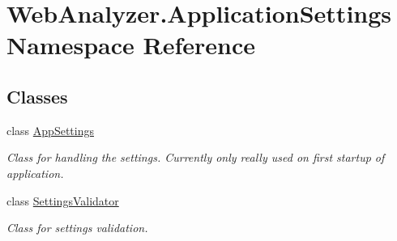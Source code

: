 \hypertarget{namespace_web_analyzer_1_1_application_settings}{}\section{Web\+Analyzer.\+Application\+Settings Namespace Reference}
\label{namespace_web_analyzer_1_1_application_settings}
\subsection*{Classes}
\begin{DoxyCompactItemize}
\item 
class \hyperlink{class_web_analyzer_1_1_application_settings_1_1_app_settings}{App\+Settings}
\begin{DoxyCompactList}\small\item\em Class for handling the settings. Currently only really used on first startup of application. \end{DoxyCompactList}\item 
class \hyperlink{class_web_analyzer_1_1_application_settings_1_1_settings_validator}{Settings\+Validator}
\begin{DoxyCompactList}\small\item\em Class for settings validation. \end{DoxyCompactList}\end{DoxyCompactItemize}
